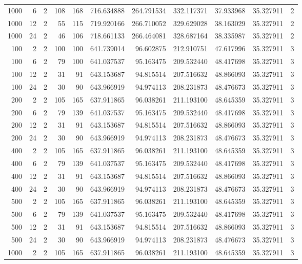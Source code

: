 \begin{table}
\begin{tabular}{rrrrrrrrrrr}
1000 & 6 & 2 & 108 & 168 & 716.634888 & 264.791534 & 332.117371 & 37.933968 & 35.327911 & 2 \\
1000 & 12 & 2 & 55 & 115 & 719.920166 & 266.710052 & 329.629028 & 38.163029 & 35.327911 & 2 \\
1000 & 24 & 2 & 46 & 106 & 718.661133 & 266.464081 & 328.687164 & 38.335987 & 35.327911 & 2 \\
100 & 2 & 2 & 100 & 100 & 641.739014 & 96.602875 & 212.910751 & 47.617996 & 35.327911 & 3 \\
100 & 6 & 2 & 79 & 100 & 641.037537 & 95.163475 & 209.532440 & 48.417698 & 35.327911 & 3 \\
100 & 12 & 2 & 31 & 91 & 643.153687 & 94.815514 & 207.516632 & 48.866093 & 35.327911 & 3 \\
100 & 24 & 2 & 30 & 90 & 643.966919 & 94.974113 & 208.231873 & 48.476673 & 35.327911 & 3 \\
200 & 2 & 2 & 105 & 165 & 637.911865 & 96.038261 & 211.193100 & 48.645359 & 35.327911 & 3 \\
200 & 6 & 2 & 79 & 139 & 641.037537 & 95.163475 & 209.532440 & 48.417698 & 35.327911 & 3 \\
200 & 12 & 2 & 31 & 91 & 643.153687 & 94.815514 & 207.516632 & 48.866093 & 35.327911 & 3 \\
200 & 24 & 2 & 30 & 90 & 643.966919 & 94.974113 & 208.231873 & 48.476673 & 35.327911 & 3 \\
400 & 2 & 2 & 105 & 165 & 637.911865 & 96.038261 & 211.193100 & 48.645359 & 35.327911 & 3 \\
400 & 6 & 2 & 79 & 139 & 641.037537 & 95.163475 & 209.532440 & 48.417698 & 35.327911 & 3 \\
400 & 12 & 2 & 31 & 91 & 643.153687 & 94.815514 & 207.516632 & 48.866093 & 35.327911 & 3 \\
400 & 24 & 2 & 30 & 90 & 643.966919 & 94.974113 & 208.231873 & 48.476673 & 35.327911 & 3 \\
500 & 2 & 2 & 105 & 165 & 637.911865 & 96.038261 & 211.193100 & 48.645359 & 35.327911 & 3 \\
500 & 6 & 2 & 79 & 139 & 641.037537 & 95.163475 & 209.532440 & 48.417698 & 35.327911 & 3 \\
500 & 12 & 2 & 31 & 91 & 643.153687 & 94.815514 & 207.516632 & 48.866093 & 35.327911 & 3 \\
500 & 24 & 2 & 30 & 90 & 643.966919 & 94.974113 & 208.231873 & 48.476673 & 35.327911 & 3 \\
1000 & 2 & 2 & 105 & 165 & 637.911865 & 96.038261 & 211.193100 & 48.645359 & 35.327911 & 3 \\

\end{tabular}
\end{table}
